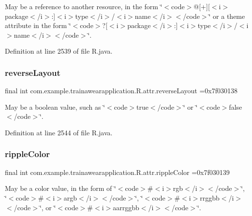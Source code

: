May be a reference to another resource, in the form \char`\"{}$<$code$>$@\mbox{[}+\mbox{]}\mbox{[}$<$i$>$package$<$/i$>$\+:\mbox{]}$<$i$>$type$<$/i$>$/$<$i$>$name$<$/i$>$$<$/code$>$\char`\"{} or a theme attribute in the form \char`\"{}$<$code$>$?\mbox{[}$<$i$>$package$<$/i$>$\+:\mbox{]}$<$i$>$type$<$/i$>$/$<$i$>$name$<$/i$>$$<$/code$>$\char`\"{}. 

Definition at line 2539 of file R.\+java.

\mbox{\label{classcom_1_1example_1_1trainawearapplication_1_1_r_1_1attr_a258d6ac63a1763c177a66d833dc264ba}} 
\subsubsection{\texorpdfstring{reverseLayout}{reverseLayout}}
{\footnotesize\ttfamily final int com.\+example.\+trainawearapplication.\+R.\+attr.\+reverse\+Layout =0x7f030138\hspace{0.3cm}{\ttfamily [static]}}

May be a boolean value, such as \char`\"{}$<$code$>$true$<$/code$>$\char`\"{} or \char`\"{}$<$code$>$false$<$/code$>$\char`\"{}. 

Definition at line 2544 of file R.\+java.

\mbox{\label{classcom_1_1example_1_1trainawearapplication_1_1_r_1_1attr_ae6841bc6f6df7ff2d82a9ce33347745c}} 
\subsubsection{\texorpdfstring{rippleColor}{rippleColor}}
{\footnotesize\ttfamily final int com.\+example.\+trainawearapplication.\+R.\+attr.\+ripple\+Color =0x7f030139\hspace{0.3cm}{\ttfamily [static]}}

May be a color value, in the form of \char`\"{}$<$code$>$\#$<$i$>$rgb$<$/i$>$$<$/code$>$\char`\"{}, \char`\"{}$<$code$>$\#$<$i$>$argb$<$/i$>$$<$/code$>$\char`\"{}, \char`\"{}$<$code$>$\#$<$i$>$rrggbb$<$/i$>$$<$/code$>$\char`\"{}, or \char`\"{}$<$code$>$\#$<$i$>$aarrggbb$<$/i$>$$<$/code$>$\char`\"{}. 

